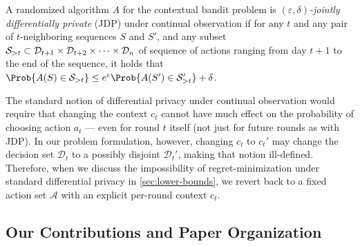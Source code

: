 \documentclass{article}
\newcommand{\A}{\mathcal{A}}
\newcommand{\D}{\mathcal{D}}
\begin{document}
\begin{definition}
\label{def:joint-dp}
  A randomized algorithm $A$ for the contextual bandit problem is
  \emph{$(\varepsilon,\delta)$-jointly differentially private} (JDP) under continual observation if for any $t$ and any pair of $t$-neighboring sequences $S$ and $S'$, and any subset ${\cal S}_{>t} \subset \mathcal{D}_{t+1} \times \mathcal{D}_{t+2} \times \cdots \times \mathcal{D}_{n}$ of sequence of actions ranging from day $t+1$ to the end of the sequence, it holds that $\Prob{A(S)\in \mathcal{S}_{>t}} \leq e^\varepsilon\Prob{A(S')\in \mathcal{S}'_{>t}} +\delta$.
\end{definition}
The standard notion of differential privacy under continual
observation would require that changing the context $c_t$ cannot have
much effect on the probability of choosing action $a_t$ --- even for
round $t$ itself (not just for future rounds as with JDP)\@.  In our
problem formulation, however, changing $c_t$ to $c_t'$ may change the
decision set $\D_t$ to a possibly disjoint $\D_t'$, making that notion
ill-defined.  Therefore, when we discuss the impossibility of
regret-minimization under standard differential privacy in
\cref{sec:lower-bounds}, we revert back to a fixed action set $\A$
with an explicit per-round context $c_t$.

\vspace{-1mm}

\subsection{Our Contributions and Paper Organization}
\label{subsec:contributions}
\end{document}
